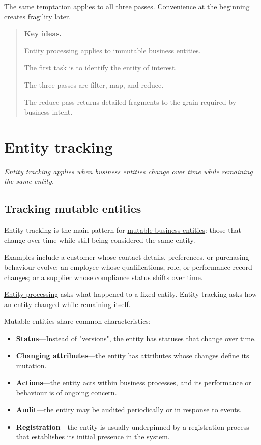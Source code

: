 \documentclass[10pt,openany,10pt]{book}
\providecommand{\tightlist}{%
  \setlength{\itemsep}{0pt}\setlength{\parskip}{0pt}}
\begin{document}
The same temptation applies to all three passes. Convenience at the
beginning creates fragility later.

\begin{quote}
\textbf{Key ideas.}

Entity processing applies to immutable business entities.

The first task is to identify the entity of interest.

The three passes are filter, map, and reduce.

The reduce pass returns detailed fragments to the grain required by
business intent.
\end{quote}

\newpage

\chapter{Entity
tracking}\label{docs-creating-information-entity-tracking}

\emph{Entity tracking applies when business entities change over time
while remaining the same entity.}

\section{Tracking mutable entities}\label{tracking-mutable-entities}

Entity tracking is the main pattern for
\hyperref[docs-creating-information-mapping-the-data-world]{mutable
business entities}: those that change over time while still being
considered the same entity.

Examples include a customer whose contact details, preferences, or
purchasing behaviour evolve; an employee whose qualifications, role, or
performance record changes; or a supplier whose compliance status shifts
over time.

\hyperref[docs-creating-information-entity-processing]{Entity
processing} asks what happened to a fixed entity. Entity tracking asks
how an entity changed while remaining itself.

Mutable entities share common characteristics:

\begin{itemize}
\tightlist
\item
  \textbf{Status}---Instead of "versions", the entity has statuses that
  change over time.
\item
  \textbf{Changing attributes}---the entity has attributes whose changes
  define its mutation.
\item
  \textbf{Actions}---the entity acts within business processes, and its
  performance or behaviour is of ongoing concern.
\item
  \textbf{Audit}---the entity may be audited periodically or in response
  to events.
\item
  \textbf{Registration}---the entity is usually underpinned by a
  registration process that establishes its initial presence in the
  system.
\end{itemize}
\end{document}
